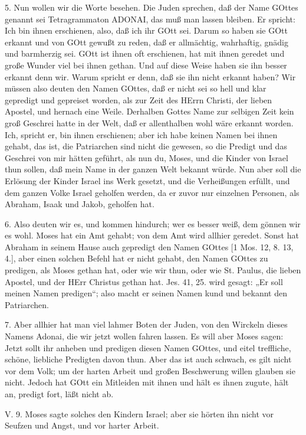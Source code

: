 5. Nun wollen wir die Worte besehen. Die Juden sprechen, daß der Name GOttes genannt sei Tetragrammaton ADONAI, das muß man lassen bleiben. Er spricht: Ich bin ihnen erschienen, also, daß ich ihr GOtt sei. Darum so haben sie GOtt erkannt und von GOtt gewußt zu reden, daß er allmächtig, wahrhaftig, gnädig und barmherzig sei. GOtt ist ihnen oft erschienen, hat mit ihnen geredet und große Wunder viel bei ihnen gethan. Und auf diese Weise haben sie ihn besser erkannt denn wir. Warum spricht er denn, daß sie ihn nicht erkannt haben? Wir müssen also deuten den Namen GOttes, daß er nicht sei so hell und klar gepredigt und gepreiset worden, als zur Zeit des HErrn Christi, der lieben Apostel, und hernach eine Weile. Derhalben Gottes Name zur selbigen Zeit kein groß Geschrei hatte in der Welt, daß er allenthalben wohl wäre erkannt worden. Ich, spricht
er, bin ihnen erschienen; aber ich habe keinen Namen bei ihnen gehabt, das ist, die Patriarchen sind nicht die gewesen, so die Predigt und das Geschrei von mir hätten geführt, als nun du, Moses, und die Kinder von Israel thun sollen, daß mein Name in der ganzen Welt bekannt würde. Nun aber soll die Erlösung der Kinder Israel ins Werk gesetzt, und die Verheißungen erfüllt, und dem ganzen Volke Israel geholfen werden, da er zuvor nur einzelnen Personen, als Abraham, Isaak und Jakob, geholfen hat.

6. Also deuten wir es, und kommen hindurch; wer es besser weiß, dem gönnen wir es wohl. Moses hat ein Amt gehabt; von dem Amt wird allhier geredet. Sonst hat Abraham in seinem Hause auch gepredigt den Namen GOttes [1 Mos. 12, 8. 13, 4.], aber einen solchen Befehl hat er nicht gehabt, den Namen GOttes zu predigen, als Moses gethan hat, oder wie wir thun, oder wie St. Paulus, die lieben Apostel, und der HErr Christus gethan hat. Jes. 41, 25. wird gesagt: „Er soll meinen Namen predigen“; also macht er seinen Namen kund und bekannt den Patriarchen.

7. Aber allhier hat man viel lahmer Boten der Juden, von den Wirckeln dieses Namens Adonai, die wir jetzt wollen fahren lassen. Es will aber Moses sagen: Jetzt sollt ihr anheben und predigen diesen Namen GOttes, und eitel treffliche, schöne, liebliche Predigten davon thun. Aber das ist auch schwach, es gilt nicht vor dem Volk; um der harten Arbeit und großen Beschwerung willen glauben sie nicht. Jedoch hat GOtt ein Mitleiden mit ihnen und hält es ihnen zugute, hält an, predigt fort, läßt nicht ab.

\begin{schriftzitat}
V. 9. Moses sagte solches den Kindern Israel; aber sie hörten ihn nicht vor Seufzen und Angst, und vor harter Arbeit.
\end{schriftzitat}

